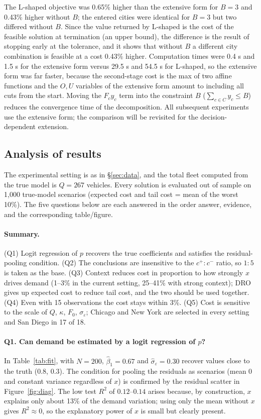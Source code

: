 \documentclass[10pt,a4paper]{article}
\begin{document}
The L-shaped objective was 0.65\% higher than the extensive form for $B=3$ and 0.43\% higher without $B$; the entered cities were identical for $B=3$ but two differed without $B$. Since the value returned by L-shaped is the cost of the feasible solution at termination (an upper bound), the difference is the result of stopping early at the tolerance, and it shows that without $B$ a different city combination is feasible at a cost 0.43\% higher. Computation times were 0.4 s and 1.5 s for the extensive form versus 29.5 s and 54.5 s for L-shaped, so the extensive form was far faster, because the second-stage cost is the max of two affine functions and the $O,U$ variables of the extensive form amount to including all cuts from the start. Moving the $F_c y_c$ term into the constraint $B$ ($\sum_{c\in C}y_c\le B$) reduces the convergence time of the decomposition. All subsequent experiments use the extensive form; the comparison will be revisited for the decision-dependent extension.

\subsection{Analysis of results}

The experimental setting is as in \S\ref{sec:data}, and the total fleet computed from the true model is $Q=267$ vehicles. Every solution is evaluated out of sample on 1{,}000 true-model scenarios (expected cost and tail cost = mean of the worst 10\%). The five questions below are each answered in the order answer, evidence, and the corresponding table/figure.

\paragraph{Summary.}
(Q1) Logit regression of $p$ recovers the true coefficients and satisfies the residual-pooling condition. (Q2) The conclusions are insensitive to the $c^+:c^-$ ratio, so $1:5$ is taken as the base. (Q3) Context reduces cost in proportion to how strongly $x$ drives demand (1--3\% in the current setting, 25--41\% with strong context); DRO gives up expected cost to reduce tail cost, and the two should be used together. (Q4) Even with 15 observations the cost stays within 3\%. (Q5) Cost is sensitive to the scale of $Q$, $\kappa$, $F_0$, $\sigma_\varepsilon$; Chicago and New York are selected in every setting and San Diego in 17 of 18.

\paragraph{Q1. Can demand be estimated by a logit regression of $p$?}
In Table~\ref{tab:fit}, with $N=200$, $\hat\beta_1=0.67$ and $\hat\sigma_\varepsilon=0.30$ recover values close to the truth ($0.8$, $0.3$). The condition for pooling the residuals as scenarios (mean 0 and constant variance regardless of $x$) is confirmed by the residual scatter in Figure~\ref{fig:diag}. The low test $R^2$ of $0.12$--$0.14$ arises because, by construction, $x$ explains only about 13\% of the demand variation; using only the mean without $x$ gives $R^2\approx0$, so the explanatory power of $x$ is small but clearly present.
\end{document}

